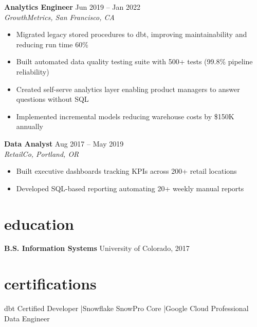 \documentclass[11pt,a4paper]{article}
\begin{document}
\noindent\textbf{Analytics Engineer} \hfill \textcolor{accent}{Jun 2019 -- Jan 2022}\\
\textit{GrowthMetrics, San Francisco, CA}
\begin{itemize}[leftmargin=1.2em,nosep,label={\textcolor{accent}{\texttt{>}}}]
\item Migrated legacy stored procedures to dbt, improving maintainability and reducing run time 60\%
\item Built automated data quality testing suite with 500+ tests (99.8\% pipeline reliability)
\item Created self-serve analytics layer enabling product managers to answer questions without SQL
\item Implemented incremental models reducing warehouse costs by \$150K annually
\end{itemize}
\vspace{0.5em}

\noindent\textbf{Data Analyst} \hfill \textcolor{accent}{Aug 2017 -- May 2019}\\
\textit{RetailCo, Portland, OR}
\begin{itemize}[leftmargin=1.2em,nosep,label={\textcolor{accent}{\texttt{>}}}]
\item Built executive dashboards tracking KPIs across 200+ retail locations
\item Developed SQL-based reporting automating 20+ weekly manual reports
\end{itemize}

\section{education}
\noindent\textbf{B.S. Information Systems} \hfill University of Colorado, 2017

\section{certifications}
\noindent dbt Certified Developer \quad\textcolor{accent}{|}\quad Snowflake SnowPro Core \quad\textcolor{accent}{|}\quad Google Cloud Professional Data Engineer
\end{document}
